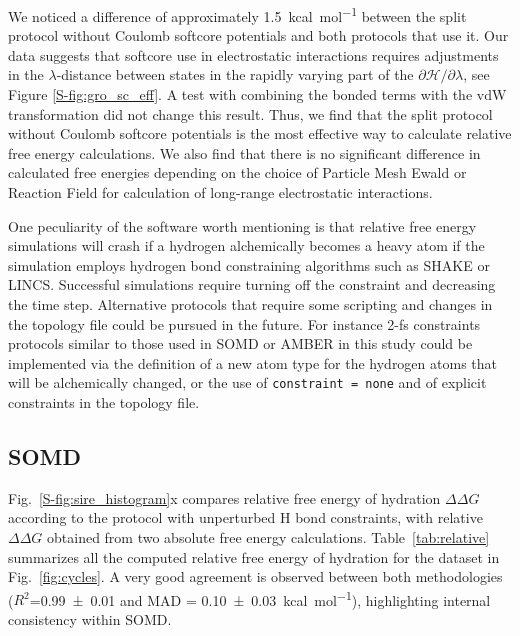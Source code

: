 \documentclass[journal=jctcce,manuscript=article]{achemso}
\newcommand{\inpopt}[1]{\texttt{#1}}
\begin{document}
We noticed a difference of approximately \SI{1.5}{kcal.mol^{-1}} between the 
split protocol without Coulomb softcore potentials and both protocols that 
use it. Our data suggests that softcore use in electrostatic interactions requires 
adjustments in the $\lambda$-distance between states in the
rapidly varying part of the $\partial \mathcal{H}/\partial\lambda$, see Figure
\ref{S-fig:gro_sc_eff}. A test with combining the bonded terms with the vdW 
transformation did not change this result.  Thus, we find that the split protocol 
without Coulomb softcore potentials is the most effective way to calculate 
relative free energy calculations.  We also find that there is no significant 
difference in calculated free energies depending on the choice of Particle 
Mesh Ewald or Reaction Field for calculation of long-range electrostatic interactions.

One peculiarity of the software worth mentioning is that relative free energy 
simulations will crash if a hydrogen alchemically becomes a heavy atom if the 
simulation employs hydrogen bond constraining algorithms such as SHAKE or LINCS.
Successful simulations require turning off the constraint and decreasing 
the time step. Alternative protocols that require some scripting and 
changes in the topology file could be pursued in the future. For instance 2-fs 
constraints protocols similar to those used in SOMD or AMBER in this study could 
be implemented via the definition of a new atom type for the hydrogen atoms 
that will be alchemically changed, or the use of \inpopt{constraint = none} and 
of explicit constraints in the topology file.

\subsection{SOMD}
\label{sec:somd-results}

Fig.~\ref{S-fig:sire_histogram}x compares relative free energy of hydration 
$\Delta\Delta G$ according to the protocol with unperturbed H bond constraints, with relative 
$\Delta \Delta G$ obtained from two absolute free energy calculations. 
Table~\ref{tab:relative} summarizes all the computed relative free energy of 
hydration for the dataset in Fig.~\ref{fig:cycles}.
A very good agreement is observed between both methodologies 
($R^2$=\SI{0.99+-0.01}{} and MAD = \SI{0.10+-0.03}{kcal.mol^{-1}}), 
highlighting internal consistency within SOMD.
\end{document}
